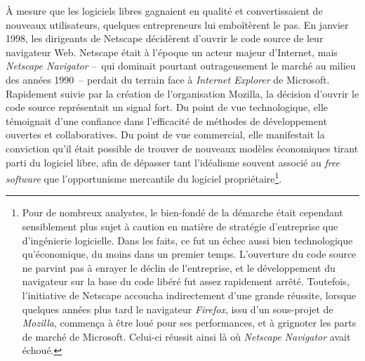 \documentclass{FramateX}
\begin{document}
\begin{refsection}
À mesure que les logiciels libres gagnaient en qualité et
convertissaient de nouveaux utilisateurs, quelques entrepreneurs lui
emboîtèrent le pas. En janvier 1998, les dirigeants de Netscape
décidèrent d'ouvrir le code source de leur navigateur Web. Netscape
était à l'époque un acteur majeur d'Internet, mais \textit{Netscape
Navigator} –~qui dominait pourtant outrageusement le marché au milieu
des années 1990~– perdait du terrain face à \textit{Internet Explorer} de Microsoft. Rapidement suivie par la création de l'organisation
Mozilla, la décision d'ouvrir le code source représentait un signal
fort. Du point de vue technologique, elle témoignait d'une confiance
dans l'efficacité de méthodes de développement ouvertes et
collaboratives. Du point de vue commercial, elle manifestait la
conviction qu'il était possible de trouver de nouveaux modèles
économiques tirant parti du logiciel libre, afin de dépasser tant
l'idéalisme souvent associé au \textit{free software} que l'opportunisme mercantile du logiciel
propriétaire\footnote{Pour de nombreux analystes, le bien-fondé de la
démarche était cependant sensiblement plus sujet à caution en matière
de stratégie d'entreprise que d'ingénierie logicielle. Dans les faits,
ce fut un échec aussi bien technologique qu'économique, du moins dans
un premier temps. L'ouverture du code source ne parvint pas à enrayer
le déclin de l'entreprise, et le développement du navigateur sur la
base du code libéré fut assez rapidement arrêté. Toutefois,
l'initiative de Netscape accoucha indirectement d'une grande réussite,
lorsque quelques années plus tard le navigateur \textit{Firefox}, issu
d'un sous-projet de \textit{Mozilla}, commença à être loué pour ses
performances, et à grignoter les parts de marché de Microsoft. Celui-ci
réussit ainsi là où \textit{Netscape Navigator} avait échoué.}. 


\end{refsection}
\end{document}
